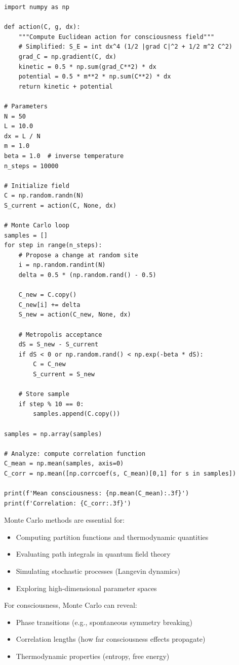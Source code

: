 \begin{lstlisting}[style=python, caption={Metropolis Monte Carlo for consciousness}]
import numpy as np

def action(C, g, dx):
    """Compute Euclidean action for consciousness field"""
    # Simplified: S_E = int dx^4 (1/2 |grad C|^2 + 1/2 m^2 C^2)
    grad_C = np.gradient(C, dx)
    kinetic = 0.5 * np.sum(grad_C**2) * dx
    potential = 0.5 * m**2 * np.sum(C**2) * dx
    return kinetic + potential

# Parameters
N = 50
L = 10.0
dx = L / N
m = 1.0
beta = 1.0  # inverse temperature
n_steps = 10000

# Initialize field
C = np.random.randn(N)
S_current = action(C, None, dx)

# Monte Carlo loop
samples = []
for step in range(n_steps):
    # Propose a change at random site
    i = np.random.randint(N)
    delta = 0.5 * (np.random.rand() - 0.5)

    C_new = C.copy()
    C_new[i] += delta
    S_new = action(C_new, None, dx)

    # Metropolis acceptance
    dS = S_new - S_current
    if dS < 0 or np.random.rand() < np.exp(-beta * dS):
        C = C_new
        S_current = S_new

    # Store sample
    if step % 10 == 0:
        samples.append(C.copy())

samples = np.array(samples)

# Analyze: compute correlation function
C_mean = np.mean(samples, axis=0)
C_corr = np.mean([np.corrcoef(s, C_mean)[0,1] for s in samples])

print(f'Mean consciousness: {np.mean(C_mean):.3f}')
print(f'Correlation: {C_corr:.3f}')
\end{lstlisting}

\begin{level3}
Monte Carlo methods are essential for:
\begin{itemize}
\item Computing partition functions and thermodynamic quantities
\item Evaluating path integrals in quantum field theory
\item Simulating stochastic processes (Langevin dynamics)
\item Exploring high-dimensional parameter spaces
\end{itemize}

For consciousness, Monte Carlo can reveal:
\begin{itemize}
\item Phase transitions (e.g., spontaneous symmetry breaking)
\item Correlation lengths (how far consciousness effects propagate)
\item Thermodynamic properties (entropy, free energy)
\end{itemize}
\end{level3}

